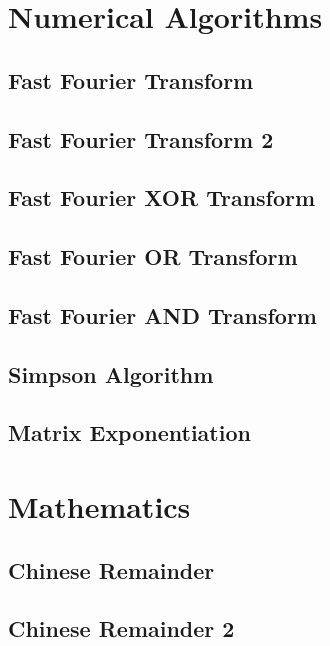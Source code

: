 \section{Numerical Algorithms}
\subsection{Fast Fourier Transform}
\raggedbottom
\hrulefill
\subsection{Fast Fourier Transform 2}
\raggedbottom
\hrulefill
\subsection{Fast Fourier XOR Transform}
\raggedbottom
\hrulefill
\subsection{Fast Fourier OR Transform}
\raggedbottom
\hrulefill
\subsection{Fast Fourier AND Transform}
\raggedbottom
\hrulefill
\subsection{Simpson Algorithm}
\raggedbottom
\hrulefill
\subsection{Matrix Exponentiation}
\raggedbottom
\hrulefill

\section{Mathematics}
\subsection{Chinese Remainder}
\raggedbottom
\hrulefill
\subsection{Chinese Remainder 2}
\raggedbottom
\hrulefill
